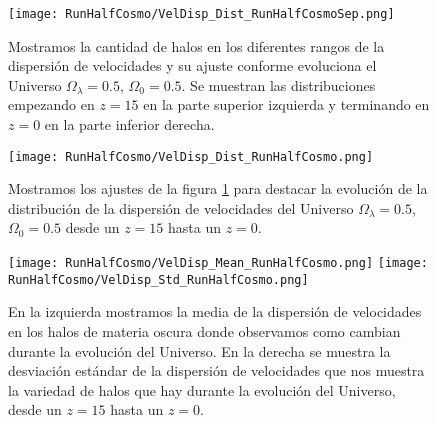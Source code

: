 \begin{figure}[H]
    \centering
    \texttt{[image: RunHalfCosmo/VelDisp\_Dist\_RunHalfCosmoSep.png]}
    \caption[Dispersión de velocidades]{\footnotesize Mostramos la cantidad de halos en los diferentes rangos de la dispersión de velocidades y su ajuste conforme evoluciona el Universo $\Omega_\lambda = 0.5$, $\Omega_0 = 0.5$. Se muestran las distribuciones empezando en $z=15$ en la parte superior izquierda y terminando en $z=0$ en la parte inferior derecha.}
    \label{fig:HalfCosmo-VelDispDistSep}
\end{figure}

\begin{figure}[H]
    \centering
    \texttt{[image: RunHalfCosmo/VelDisp\_Dist\_RunHalfCosmo.png]}
    \caption[Distribución de la dispersión de velocidades]{\footnotesize Mostramos los ajustes de la figura \ref{fig:HalfCosmo-VelDispDistSep} para destacar la evolución de la distribución de la dispersión de velocidades del Universo $\Omega_\lambda = 0.5$, $\Omega_0 = 0.5$ desde un $z=15$ hasta un $z=0$.}
    \label{fig:HalfCosmo-VelDispDist}
\end{figure}

\begin{figure}[H]
    \centering
    \texttt{[image: RunHalfCosmo/VelDisp\_Mean\_RunHalfCosmo.png]}
    \texttt{[image: RunHalfCosmo/VelDisp\_Std\_RunHalfCosmo.png]}
    \caption[Media y desviación estándar de la dispersión de velocidades]{\footnotesize En la izquierda mostramos la media de la dispersión de velocidades en los halos de materia oscura donde observamos como cambian durante la evolución del Universo. En la derecha se muestra la desviación estándar de la dispersión de velocidades que nos muestra la variedad de halos que hay durante la evolución del Universo, desde un $z=15$ hasta un $z=0$.}
    \label{fig:HalfCosmo-VelDispStats}
\end{figure}

